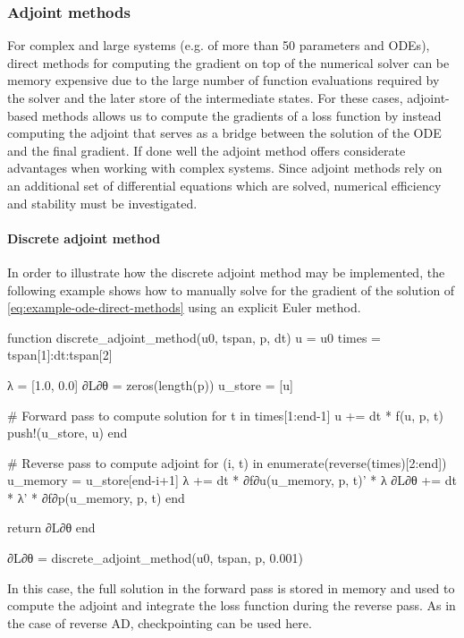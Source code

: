 \subsubsection{Adjoint methods}
\label{section:computing-adjoints}

For complex and large systems (e.g. of more than 50 parameters and ODEs), direct methods for computing the gradient on top of the numerical solver can be memory expensive due to the large number of function evaluations required by the solver and the later store of the intermediate states. 
For these cases, adjoint-based methods allows us to compute the gradients of a loss function by instead computing the adjoint that serves as a bridge between the solution of the ODE and the final gradient. 
If done well the adjoint method offers considerate advantages when working with complex systems.
Since adjoint methods rely on an additional set of differential equations which are solved, numerical efficiency and stability must be investigated.

\paragraph{Discrete adjoint method}

In order to illustrate how the discrete adjoint method may be implemented, the following example shows how to manually solve for the gradient of the solution of \eqref{eq:example-ode-direct-methods} using an explicit Euler method. 
\begin{jllisting}
function discrete_adjoint_method(u0, tspan, p, dt)
    u = u0
    times = tspan[1]:dt:tspan[2]

    λ = [1.0, 0.0]
    ∂L∂θ = zeros(length(p))
    u_store = [u]

    # Forward pass to compute solution
    for t in times[1:end-1]
        u += dt * f(u, p, t)
        push!(u_store, u)
    end

    # Reverse pass to compute adjoint
    for (i, t) in enumerate(reverse(times)[2:end])
        u_memory = u_store[end-i+1]
        λ += dt * ∂f∂u(u_memory, p, t)' * λ
        ∂L∂θ += dt * λ' * ∂f∂p(u_memory, p, t)
    end

    return ∂L∂θ
end

∂L∂θ = discrete_adjoint_method(u0, tspan, p, 0.001) 
\end{jllisting}
In this case, the full solution in the forward pass is stored in memory and used to compute the adjoint and integrate the loss function during the reverse pass. 
As in the case of reverse AD, checkpointing can be used here. 


